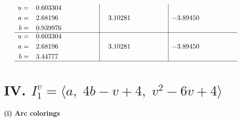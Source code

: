 \documentclass[1p]{elsarticle_modified}
\theoremstyle{definition}
\begin{document}
$$\begin{array}{c|c|c}
\begin{aligned}
u &= \phantom{-}0.603304\phantom{ +0.000000I} \\
a &= \phantom{-}2.68196\phantom{ +0.000000I} \\
b &= \phantom{-}0.939976\phantom{ +0.000000I}\end{aligned}
 & \phantom{-}3.10281\phantom{ +0.000000I} & -3.89450\phantom{ +0.000000I} \\ \hline\begin{aligned}
u &= \phantom{-}0.603304\phantom{ +0.000000I} \\
a &= \phantom{-}2.68196\phantom{ +0.000000I} \\
b &= \phantom{-}3.44777\phantom{ +0.000000I}\end{aligned}
 & \phantom{-}3.10281\phantom{ +0.000000I} & -3.89450\phantom{ +0.000000I}\\
 \hline 
 \end{array}$$\newpage\newpage\renewcommand{\arraystretch}{1}
\centering \section*{IV. $I^v_{1}= \langle a,\;4 b- v+4,\;v^2-6 v+4 \rangle$}
\flushleft \textbf{(i) Arc colorings}\\
\end{document}
